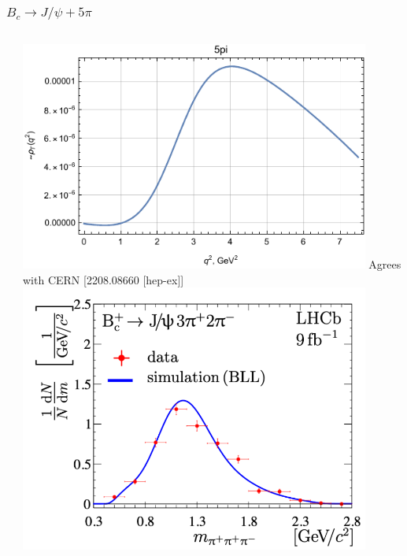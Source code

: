 \documentclass{beamer}
\begin{document}
\begin{frame}
  \frametitle{$B_c\to J/\psi +  5\pi$}
    \begin{columns}
    \begin{column}{0.5\textwidth}
    \end{column}
    \begin{column}{0.5\textwidth}
      \includegraphics[width=0.9\textwidth]{figs/rhoT_5pi_q2}
      Agrees with CERN [2208.08660 [hep-ex]]
      \includegraphics[width=0.9\textwidth]{figs/2208_08660_Fig4}      
    \end{column}
  \end{columns}

\end{frame}
\end{document}
